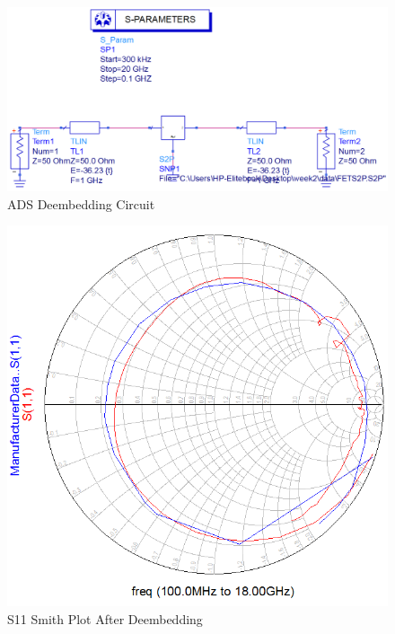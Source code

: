 \documentclass[conference]{IEEEtran}
\begin{document}
\begin{figure}[!h]
\centering
\includegraphics[scale=0.25]{pics/DeembedCircuit.png}
\caption{ADS Deembedding Circuit}
\label{fig:adsdeembed}
\end{figure}
\begin{figure}[!h]
\centering
\includegraphics[scale=0.3]{pics/S11SmithDeembed.png}
\caption{S11 Smith Plot After Deembedding}
\label{fig:s11smithdeembed}
\end{figure}
\end{document}
